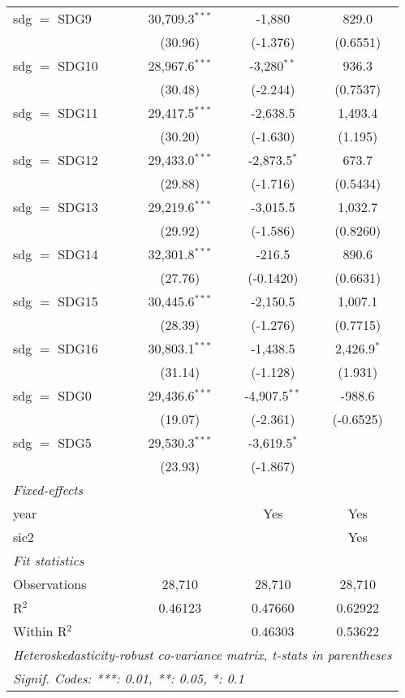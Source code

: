 \begin{tabular}{lccc}
   sdg $=$ SDG9  & 30,709.3$^{***}$ & -1,880          & 829.0\\   
                 & (30.96)          & (-1.376)        & (0.6551)\\   
   sdg $=$ SDG10 & 28,967.6$^{***}$ & -3,280$^{**}$   & 936.3\\   
                 & (30.48)          & (-2.244)        & (0.7537)\\   
   sdg $=$ SDG11 & 29,417.5$^{***}$ & -2,638.5        & 1,493.4\\   
                 & (30.20)          & (-1.630)        & (1.195)\\   
   sdg $=$ SDG12 & 29,433.0$^{***}$ & -2,873.5$^{*}$  & 673.7\\   
                 & (29.88)          & (-1.716)        & (0.5434)\\   
   sdg $=$ SDG13 & 29,219.6$^{***}$ & -3,015.5        & 1,032.7\\   
                 & (29.92)          & (-1.586)        & (0.8260)\\   
   sdg $=$ SDG14 & 32,301.8$^{***}$ & -216.5          & 890.6\\   
                 & (27.76)          & (-0.1420)       & (0.6631)\\   
   sdg $=$ SDG15 & 30,445.6$^{***}$ & -2,150.5        & 1,007.1\\   
                 & (28.39)          & (-1.276)        & (0.7715)\\   
   sdg $=$ SDG16 & 30,803.1$^{***}$ & -1,438.5        & 2,426.9$^{*}$\\   
                 & (31.14)          & (-1.128)        & (1.931)\\   
   sdg $=$ SDG0  & 29,436.6$^{***}$ & -4,907.5$^{**}$ & -988.6\\   
                 & (19.07)          & (-2.361)        & (-0.6525)\\   
   sdg $=$ SDG5  & 29,530.3$^{***}$ & -3,619.5$^{*}$  &   \\   
                 & (23.93)          & (-1.867)        &   \\   
   \midrule
   \emph{Fixed-effects}\\
   year          &                  & Yes             & Yes\\  
   sic2          &                  &                 & Yes\\  
   \midrule
   \emph{Fit statistics}\\
   Observations  & 28,710           & 28,710          & 28,710\\  
   R$^2$         & 0.46123          & 0.47660         & 0.62922\\  
   Within R$^2$  &                  & 0.46303         & 0.53622\\  
   \midrule \midrule
   \multicolumn{4}{l}{\emph{Heteroskedasticity-robust co-variance matrix, t-stats in parentheses}}\\
   \multicolumn{4}{l}{\emph{Signif. Codes: ***: 0.01, **: 0.05, *: 0.1}}\\
\end{tabular}
\par\endgroup


